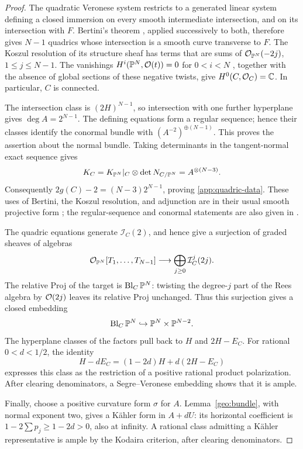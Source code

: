 \begin{proof}
The quadratic Veronese system restricts to a generated linear system
defining a closed immersion on every smooth intermediate intersection,
and on its intersection with $F$. Bertini's theorem
\cite[Tag~0FD6]{Stacks}, applied successively to both, therefore gives
$N-1$ quadrics whose intersection is a smooth curve transverse to $F$.
The Koszul
resolution of its structure sheaf has terms that are sums of
$\mathcal O_{\mathbb P^N}(-2j)$, $1\le j\le N-1$. The vanishings
$H^i(\mathbb P^N,\mathcal O(t))=0$ for $0<i<N$
\cite[Tag~01XT]{Stacks}, together with the absence of global
sections of these negative twists, give
$H^0(C,\mathcal O_C)=\mathbb C$. In particular, $C$ is connected.

The intersection class is $(2H)^{N-1}$, so intersection with one further
hyperplane gives $\deg A=2^{N-1}$. The defining equations form a regular
sequence; hence their classes identify the conormal bundle with
$(A^{-2})^{\oplus(N-1)}$. This proves the assertion about the normal bundle.
Taking determinants in the tangent-normal exact sequence gives
\[
 K_C=K_{\mathbb P^N}|_C\otimes\det N_{C/\mathbb P^N}
     =A^{\otimes(N-3)}.
\]
Consequently $2g(C)-2=(N-3)2^{N-1}$, proving
\eqref{app:quadric-data}. These uses of Bertini, the Koszul resolution,
and adjunction are in their usual smooth projective form
\cite{Hartshorne1977}; the regular-sequence and conormal statements
are also given in \cite[Tags~063C and~06AA]{Stacks}.

The quadric equations generate $\mathcal I_C(2)$, and hence give a
surjection of graded sheaves of algebras
\[
 \mathcal O_{\mathbb P^N}[T_1,\ldots,T_{N-1}]
 \longrightarrow\bigoplus_{j\ge0}\mathcal I_C^j(2j).
\]
The relative Proj of the target is $\operatorname{Bl}_C\mathbb P^N$: twisting the degree-$j$
part of the Rees algebra by $\mathcal O(2j)$ leaves its relative Proj unchanged.
Thus this surjection gives a closed embedding
\[
 \operatorname{Bl}_C\mathbb P^N\hookrightarrow\mathbb P^N\times\mathbb P^{N-2}.
\]
The hyperplane classes of the factors pull back to $H$ and $2H-E_C$.
For rational $0<d<1/2$, the identity
\[
 H-dE_C=(1-2d)H+d(2H-E_C)
\]
expresses this class as the restriction of a positive rational product
polarization. After clearing denominators, a Segre--Veronese embedding
shows that it is ample.

Finally, choose a positive curvature form $\sigma$ for $A$.
Lemma~\ref{geo:bundle}, with normal exponent two, gives a K\"ahler form in
$A+dU$: its horizontal coefficient is $1-2\sum p_j\ge1-2d>0$, also at
infinity. A rational class admitting a K\"ahler representative is ample
by the Kodaira criterion, after clearing denominators.
\end{proof}

